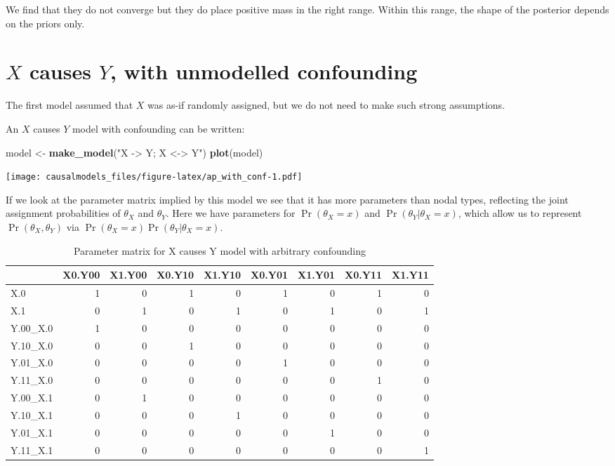\documentclass[
  12pt,
]{book}
\newenvironment{Shaded}{\begin{snugshade}}{\end{snugshade}}
\newcommand{\FunctionTok}[1]{\textcolor[rgb]{0.13,0.29,0.53}{\textbf{#1}}}
\newcommand{\NormalTok}[1]{#1}
\newcommand{\OtherTok}[1]{\textcolor[rgb]{0.56,0.35,0.01}{#1}}
\newcommand{\StringTok}[1]{\textcolor[rgb]{0.31,0.60,0.02}{#1}}
\begin{document}
We find that they do not converge but they do place positive mass in the right range. Within this range, the shape of the posterior depends on the priors only.

\hypertarget{x-causes-y-with-unmodelled-confounding}{%
\section{\texorpdfstring{\(X\) causes \(Y\), with unmodelled confounding}{X causes Y, with unmodelled confounding}}\label{x-causes-y-with-unmodelled-confounding}}

The first model assumed that \(X\) was as-if randomly assigned, but we do not need to make such strong assumptions.

An \(X\) causes \(Y\) model with confounding can be written:

\begin{Shaded}
\begin{Highlighting}[]
\NormalTok{model }\OtherTok{\textless{}{-}} \FunctionTok{make\_model}\NormalTok{(}\StringTok{"X {-}\textgreater{} Y; X \textless{}{-}\textgreater{} Y"}\NormalTok{) }
\FunctionTok{plot}\NormalTok{(model)}
\end{Highlighting}
\end{Shaded}

\texttt{[image: causalmodels\_files/figure-latex/ap\_with\_conf-1.pdf]}

If we look at the parameter matrix implied by this model we see that it has more parameters than nodal types, reflecting the joint assignment probabilities of \(\theta_X\) and \(\theta_Y\). Here we have parameters for \(\Pr(\theta_X=x)\) and \(\Pr(\theta_Y |\theta_X=x)\), which allow us to represent \(\Pr(\theta_X, \theta_Y)\) via \(\Pr(\theta_X=x)\Pr(\theta_Y |\theta_X=x)\).

\begin{table}

\caption{\label{tab:unnamed-chunk-58}Parameter matrix for X causes Y model with arbitrary confounding}
\centering
\begin{tabular}[t]{l|r|r|r|r|r|r|r|r}
\hline
  & X0.Y00 & X1.Y00 & X0.Y10 & X1.Y10 & X0.Y01 & X1.Y01 & X0.Y11 & X1.Y11\\
\hline
X.0 & 1 & 0 & 1 & 0 & 1 & 0 & 1 & 0\\
\hline
X.1 & 0 & 1 & 0 & 1 & 0 & 1 & 0 & 1\\
\hline
Y.00\_X.0 & 1 & 0 & 0 & 0 & 0 & 0 & 0 & 0\\
\hline
Y.10\_X.0 & 0 & 0 & 1 & 0 & 0 & 0 & 0 & 0\\
\hline
Y.01\_X.0 & 0 & 0 & 0 & 0 & 1 & 0 & 0 & 0\\
\hline
Y.11\_X.0 & 0 & 0 & 0 & 0 & 0 & 0 & 1 & 0\\
\hline
Y.00\_X.1 & 0 & 1 & 0 & 0 & 0 & 0 & 0 & 0\\
\hline
Y.10\_X.1 & 0 & 0 & 0 & 1 & 0 & 0 & 0 & 0\\
\hline
Y.01\_X.1 & 0 & 0 & 0 & 0 & 0 & 1 & 0 & 0\\
\hline
Y.11\_X.1 & 0 & 0 & 0 & 0 & 0 & 0 & 0 & 1\\
\hline
\end{tabular}
\end{table}
\end{document}
